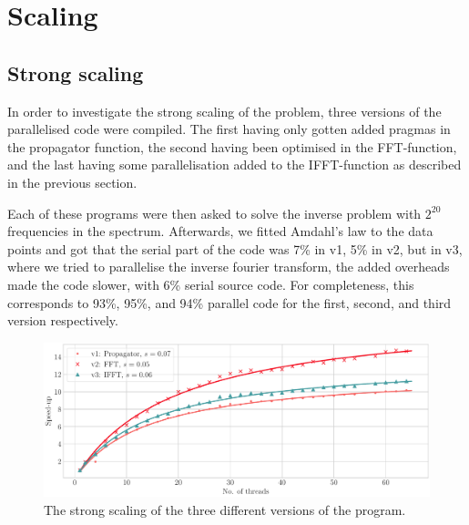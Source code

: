 \documentclass{article}
\begin{document}
\section{Scaling}
\subsection{Strong scaling}
In order to investigate the strong scaling of the problem, three versions of the parallelised code were compiled. The first having only gotten added pragmas in the propagator function, the second having been optimised in the FFT-function, and the last having some parallelisation added to the IFFT-function as described in the previous section.

Each of these programs were then asked to solve the inverse problem with \(2^{20}\) frequencies in the spectrum. Afterwards, we fitted Amdahl's law to the data points and got that the serial part of the code was 7\% in v1, 5\% in v2, but in v3, where we tried to parallelise the inverse fourier transform, the added overheads made the code slower, with 6\% serial source code.
For completeness, this corresponds to 93\%, 95\%, and 94\% parallel code for the first, second, and third version respectively.
\begin{figure}
    \centering
    \includegraphics[width=\textwidth]{./figures/amdahl.pdf}
    \caption{The strong scaling of the three different versions of the program.}
    \label{fig:amdahl}
\end{figure}
\end{document}
